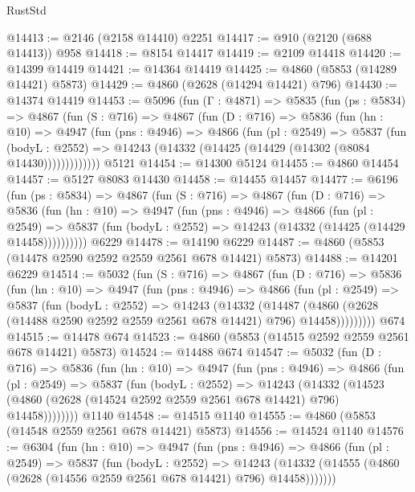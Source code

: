 \begin{lexlean}{RustStd}
\begin{coremodule}
@14413 := @2146 (@2158 @14410) @2251
@14417 := @910 (@2120 (@688 @14413)) @958
@14418 := @8154 @14417
@14419 := @2109 @14418
@14420 := @14399 @14419
@14421 := @14364 @14419
@14425 := @4860 (@5853 (@14289 @14421) @5873)
@14429 := @4860 (@2628 (@14294 @14421) @796)
@14430 := @14374 @14419
@14453 := @5096
    (fun (Γ : @4871) =>
    @5835
      (fun (ps : @5834) =>
      @4867
        (fun (S : @716) =>
        @4867
          (fun (D : @716) =>
          @5836
            (fun (hn : @10) =>
            @4947
              (fun (pns : @4946) =>
              @4866
                (fun (pl : @2549) =>
                @5837
                  (fun (bodyL : @2552) =>
                  @14243 (@14332 (@14425 (@14429 (@14302 (@8084 @14430)))))))))))))
    @5121
@14454 := @14300 @5124
@14455 := @4860 @14454
@14457 := @5127 @8083 @14430
@14458 := @14455 @14457
@14477 := @6196
    (fun (ps : @5834) =>
    @4867
      (fun (S : @716) =>
      @4867
        (fun (D : @716) =>
        @5836
          (fun (hn : @10) =>
          @4947
            (fun (pns : @4946) =>
            @4866
              (fun (pl : @2549) =>
              @5837 (fun (bodyL : @2552) => @14243 (@14332 (@14425 (@14429 @14458))))))))))
    @6229
@14478 := @14190 @6229
@14487 := @4860 (@5853 (@14478 @2590 @2592 @2559 @2561 @678 @14421) @5873)
@14488 := @14201 @6229
@14514 := @5032
    (fun (S : @716) =>
    @4867
      (fun (D : @716) =>
      @5836
        (fun (hn : @10) =>
        @4947
          (fun (pns : @4946) =>
          @4866
            (fun (pl : @2549) =>
            @5837
              (fun (bodyL : @2552) =>
              @14243
                (@14332
                  (@14487
                    (@4860 (@2628 (@14488 @2590 @2592 @2559 @2561 @678 @14421) @796) @14458)))))))))
    @674
@14515 := @14478 @674
@14523 := @4860 (@5853 (@14515 @2592 @2559 @2561 @678 @14421) @5873)
@14524 := @14488 @674
@14547 := @5032
    (fun (D : @716) =>
    @5836
      (fun (hn : @10) =>
      @4947
        (fun (pns : @4946) =>
        @4866
          (fun (pl : @2549) =>
          @5837
            (fun (bodyL : @2552) =>
            @14243
              (@14332
                (@14523 (@4860 (@2628 (@14524 @2592 @2559 @2561 @678 @14421) @796) @14458))))))))
    @1140
@14548 := @14515 @1140
@14555 := @4860 (@5853 (@14548 @2559 @2561 @678 @14421) @5873)
@14556 := @14524 @1140
@14576 := @6304
    (fun (hn : @10) =>
    @4947
      (fun (pns : @4946) =>
      @4866
        (fun (pl : @2549) =>
        @5837
          (fun (bodyL : @2552) =>
          @14243 (@14332 (@14555 (@4860 (@2628 (@14556 @2559 @2561 @678 @14421) @796) @14458)))))))

\end{coremodule}
\end{lexlean}
